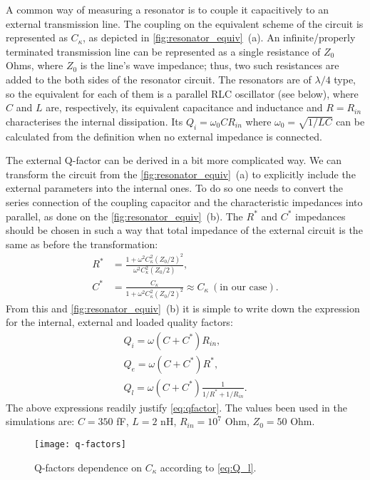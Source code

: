 \documentclass[12pt, twoside]{report}
\numberwithin{equation}{section}
\begin{document}
A common way of measuring a resonator is to couple it capacitively to an external transmission line. The coupling on the equivalent scheme of the circuit is represented as $C_\kappa$, as depicted in \autoref{fig:resonator_equiv}~(a). An infinite/properly terminated transmission line can be represented as a single resistance of $Z_0$ Ohms, where $Z_0$ is the line's wave impedance; thus, two such resistances are added to the both sides of the resonator circuit. The resonators are of $\lambda/4$ type, so the equivalent for each of them is a parallel RLC oscillator (see below), where $C$ and $L$ are, respectively, its equivalent capacitance and inductance and $R=R_{in}$ characterises the internal dissipation. Its $Q_i  = \omega_0 C R_{in}$ where $\omega_0 = \sqrt{1/LC}$ can be calculated from the definition when no external impedance is connected.
 
The external Q-factor can be derived in a bit more complicated way\cite{Goppl2008}. We can transform the circuit from the \autoref{fig:resonator_equiv}~(a) to explicitly include the external parameters into the internal ones. To do so one needs to convert the series connection of the coupling capacitor and the characteristic impedances into parallel, as done on the \autoref{fig:resonator_equiv}~(b). The $R^*$ and $C^*$ impedances should be chosen in such a way that total impedance of the external circuit is the same as before the transformation:
\begin{align}
R^{*} &= \frac{1+\omega^2 C_\kappa^2 (Z_0/2)^2}{\omega^2 C_\kappa^2 (Z_0/2)	}, \\
C^{*} &= \frac{C_\kappa}{1+\omega^2 C_\kappa^2 (Z_0/2)^2} \approx C_\kappa\ (\text{in our case}). \label{eq:C_ast}
\end{align}
From this and \autoref{fig:resonator_equiv}~(b) it is simple to write down the expression for the internal, external and loaded quality factors:
\begin{gather}
Q_i =  \omega (C+C^{*}) R_{in}, \\
Q_e = \omega (C+C^{*}) R^{*}, \\
Q_l = \omega (C+C^{*})  \frac{1}{1/R^{*}+1/R_{in}}. \label{eq:Q_l}
\end{gather}
The above expressions readily justify \eqref{eq:qfactor}. The values been used in the simulations are: $C = 350$ fF, $L = 2$ nH, $R_{in}=10^7$ Ohm, $Z_0 = 50$ Ohm. 


\begin{figure}
\centering
\texttt{[image: q-factors]}
\caption{Q-factors dependence on $C_\kappa$ according to \eqref{eq:Q_l}.}
\end{figure}
\end{document}
